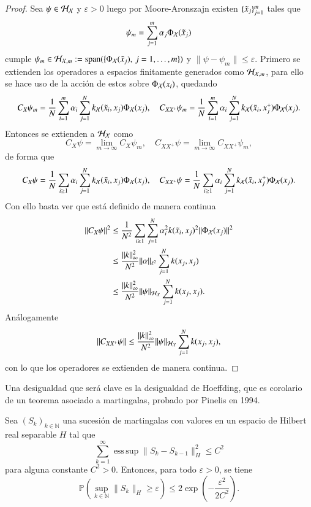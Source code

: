 \begin{proof}
    Sea $\psi \in \mathcal{H}_{\mathcal{X}}$ y $\varepsilon > 0$ luego por Moore-Aronszajn existen $\{ \Tilde{x}_j \}_{j=1}^m$ tales que
    \[
    \psi_m = \sum_{j=1}^m \alpha_j \Phi_{\mathcal{X}} (\Tilde{x}_j)
    \]
    cumple $\psi_m \in \mathcal{H}_{\mathcal{X}, m} := \text{span}(\{ \Phi_{\mathcal{X}} (\Tilde{x}_j), \, j=1,\dots,m \})$ y $\| \psi - \psi_m \| \leq \varepsilon$. Primero se extienden los operadores a espacios finitamente generados como $\mathcal{H}_{\mathcal{X}, m}$, para ello se hace uso de la acción de estos sobre $\Phi_{\mathcal{X}} (x_i)$, quedando
    \[
    C_X \psi_m =
    \frac{1}{N} \sum_{i=1}^m \alpha_i \sum_{j = 1}^N k_{\mathcal{X}}(\Tilde{x}_i, x_j) \Phi_{\mathcal{X}} (x_j), \quad C_{XX^+} \psi_m =
    \frac{1}{N} \sum_{i=1}^m \alpha_i \sum_{j = 1}^N k_{\mathcal{X}}(\Tilde{x}_i, x_j^+) \Phi_{\mathcal{X}} (x_j).
    \]
    Entonces se extienden a $\mathcal{H}_{\mathcal{X}}$ como
    \[
    C_X \psi = \lim_{m \to \infty} C_X \psi_m, \quad C_{XX^+} \psi = \lim_{m \to \infty} C_{XX^+} \psi_m,
    \]
    de forma que
    \[
    C_X \psi =
    \frac{1}{N} \sum_{i \geq 1} \alpha_i \sum_{j = 1}^N k_{\mathcal{X}}(\Tilde{x}_i, x_j) \Phi_{\mathcal{X}} (x_j), \quad C_{XX^+} \psi =
    \frac{1}{N} \sum_{i \geq 1} \alpha_i \sum_{j = 1}^N k_{\mathcal{X}}(\Tilde{x}_i, x_j^+) \Phi_{\mathcal{X}} (x_j).
    \]
    Con ello basta ver que está definido de manera continua
    \[
    \begin{aligned}
        \| C_X \psi \|^2 & \leq \frac{1}{N^2} \sum_{i \geq 1} \sum_{j=1}^N \alpha_i^2 k(\Tilde{x}_i, x_j)^2 \| \Phi_{\mathcal{X}} (x_j) \|^2 \\
        & \leq \frac{\| k \|_\infty^2}{N^2} \| \alpha \|_{\ell^2} \sum_{j=1}^N k(x_j, x_j) \\
        & \leq \frac{\| k \|_\infty^2}{N^2} \| \psi \|_{\mathcal{H}_{\mathcal{X}}} \sum_{j=1}^N k(x_j, x_j). \\
    \end{aligned}
    \]
    Análogamente
    \[
    \| C_{XX^+} \psi \| \leq \frac{\| k \|_\infty^2}{N^2} \| \psi \|_{\mathcal{H}_{\mathcal{X}}} \sum_{j=1}^N k(x_j, x_j),
    \]
    con lo que los operadores se extienden de manera continua.
\end{proof}

Una desigualdad que será clave es la desigualdad de Hoeffding, que es corolario de un teorema asociado a martingalas, probado por Pinelis en 1994.

\begin{teo}
Sea $(S_k)_{k \in \mathbb{N}}$ una sucesión de martingalas con valores en un espacio de Hilbert real separable $H$ tal que 
\[
\sum_{k=1}^\infty \operatorname{ess\,sup} \|S_k - S_{k-1}\|_H^2 \leq C^2
\]
para alguna constante $C^2 > 0$. Entonces, para todo $\varepsilon > 0$, se tiene
\[
\mathbb{P} \left( \sup_{k \in \mathbb{N}} \|S_k\|_H \geq \varepsilon \right) \leq 2 \exp \left( -\frac{\varepsilon^2}{2C^2} \right).
\]
\end{teo}

